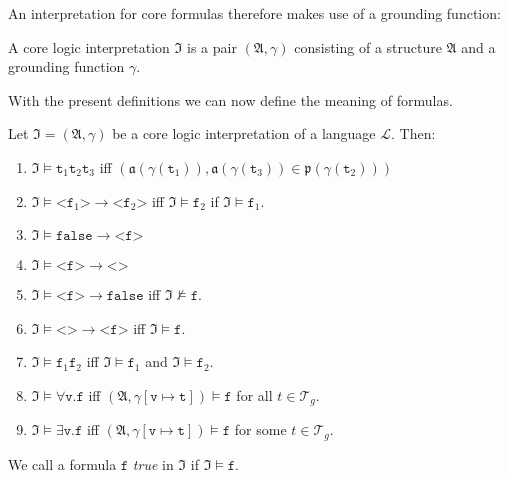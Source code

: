 An interpretation for core formulas therefore makes use of a grounding function:


\begin{definition}
A core logic interpretation $\mathfrak{I}$ is a pair $(\mathfrak{A}, \gamma)$ consisting of a structure $\mathfrak{A}$ and a grounding function $\gamma$.
\end{definition}


With the present definitions we can now define the meaning  of formulas. 


\begin{definition}
Let $\mathfrak{I}=(\mathfrak{A}, \gamma)$ be a core logic interpretation of a language $\mathcal{L}$. %
Then:
 \begin{enumerate}
 \item $\mathfrak{I}\models \texttt{t}_1\texttt{t}_2 \texttt{t}_3$ iff 
 $(\mathfrak{a}(\gamma(\texttt{t}_1)), \mathfrak{a}(\gamma(\texttt{t}_3))\in \mathfrak{p}(\gamma(\texttt{t}_2)))$
  \item $\mathfrak{I}\models \texttt{<f}_1\texttt{>}\rightarrow \texttt{<f}_2\texttt{>}$ iff 
  $\mathfrak{I}\models \texttt{f}_2$ if $\mathfrak{I}\models \texttt{f}_1$.
  \item $\mathfrak{I}\models \texttt{false} \rightarrow \texttt{<f>}$
  \item $\mathfrak{I}\models \texttt{<f>}\rightarrow \texttt{<>}$
  \item $\mathfrak{I}\models \texttt{<f>} \rightarrow \texttt{false}$ iff $\mathfrak{I}\not \models \texttt{f}$.
  \item $\mathfrak{I}\models \texttt{<>} \rightarrow \texttt{<f>}$ iff $\mathfrak{I}\models \texttt{f}$.
  \item $\mathfrak{I}\models \texttt{f}_1\texttt{f}_2$ iff $\mathfrak{I}\models \texttt{f}_1$ and $\mathfrak{I}\models \texttt{f}_2$.
  \item $\mathfrak{I}\models \forall \texttt{v.f}$ iff $(\mathfrak{A}, \gamma[\texttt{v}\mapsto\texttt{t}])\models\texttt{f}$ for all $t\in \mathcal{T}_g$.
  \item $\mathfrak{I}\models \exists \texttt{v.f}$ iff $(\mathfrak{A}, \gamma[\texttt{v}\mapsto\texttt{t}])\models \texttt{f}$ for some $t\in \mathcal{T}_g$.
 \end{enumerate}
%
We call a formula $\texttt{f}$ \emph{true} in $\mathfrak{I}$ if $\mathfrak{I}\models \texttt{f}$. 
\end{definition}

